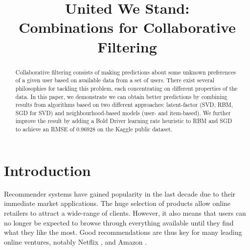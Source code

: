 \documentclass[10pt,conference,compsocconf]{IEEEtran}
\begin{document}
	\title{United We Stand:\\ Combinations for Collaborative Filtering}
	
	\author{
		\and
		\and
	}
	
	\maketitle
	
	\begin{abstract}
		Collaborative filtering consists of making predictions about some unknown preferences of a given user based on available data from a set of users. There exist several philosophies for tackling this problem, each concentrating on different properties of the data. In this paper, we demonstrate we can obtain better predictions by combining results from algorithms based on two different approaches: latent-factor (SVD, RBM, SGD for SVD) and neighbourhood-based models (user- and item-based). We further improve the result by adding a Bold Driver learning rate heuristic to RBM and SGD to achieve an RMSE of 0.96928 on the Kaggle public dataset.
	\end{abstract}
	
	\section{Introduction}
	
	Recommender systems have gained popularity in the last decade due to their immediate market applications. The huge selection of products allow online retailers to attract a wide-range of clients. However, it also means that users can no longer be expected to browse through everything available until they find what they like the most. Good recommendations are thus key for many leading online ventures, notably Netflix \cite{amatriain2012netflix}, and Amazon \cite{linden2003amazon}.
	
\end{document}
